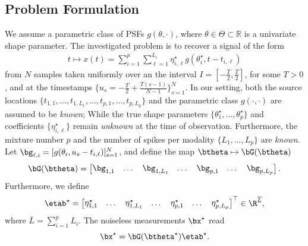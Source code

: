 \documentclass[conference,english,final,svgnames]{IEEEtran}
\begin{document}
\subsection{Problem Formulation}\label{subsec:problem_formulation}

We assume a parametric class of PSFs $g(\theta,\cdot)$, where $\theta \in \Theta \subset \mathbb{R}$ is a univariate shape parameter. The investigated problem is to recover a signal of the form
\begin{align}
\label{eq:signal-model}
    t \mapsto x(t) = \sum_{i = 1}^p \sum_{\ell = 1}^{L_i}{\eta^\star_{i,\ell}} g(\theta_i^\star, t - t_{i,\ell})
\end{align}
from $N$ samples taken uniformly over an the interval $I = [-\tfrac{T}{2}, \tfrac{T}{2}]$, for some $T>0$, and at the timestamps $\{u_s = -\tfrac{T}{2} + \tfrac{T(s-1)}{N-1}\}_{s=1}^N$. In our setting, both the source locations $\{t_{1,1}, \dots, t_{1,L_1}, \dots, t_{p,1}, \dots, t_{p,L_p}\}$ and the parametric class $ g(\cdot, \cdot)$ are assumed to be \emph{known}; While the true shape parameters $ \{\theta_1^\star, \dots, \theta_p^\star\} $ and coefficients $\{\eta_{i,\ell}^\star\}$ remain \emph{unknown} at the time of observation. Furthermore, the mixture number $p$ and the
number of spikes per modality $\{L_1, \dots, L_p\}$ are \emph{known}. 
Let $\bg_{\ell,i} = [g(\theta_i, u_s - t_{i,\ell})]_{s=1}^N$, and define the map $\btheta \mapsto\bG(\btheta)$
\begin{align}
	\bG(\btheta) = \begin{bmatrix}
        \bg_{1,1} & \dots & \bg_{1,L_1} & \dots & \bg_{p,1} & \dots & \bg_{p,L_p}
     \end{bmatrix}.
\end{align}
Furthermore, we define
\begin{equation}\etab^{\star} = \begin{bmatrix}
    \eta^{\star}_{1,1} & \dots & \eta_{1, L_1}^{\star} & \dots & \eta_{p,1}^{\star} & \dots & \eta_{p, L_p}^{\star}
\end{bmatrix}^\top \in \R^{\overline{L}},
\end{equation}
where $\overline{L} = \sum_{i=1}^p L_i$. The noiseless measurements $\bx^\star$ read
\begin{equation}\label{eq:ground_truth}
    \bx^{\star} = \bG(\btheta^{\star})\etab^{\star}.
\end{equation}
\end{document}
